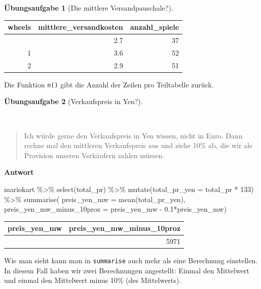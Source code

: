 \documentclass[
  letterpaper,
]{scrbook}
\newenvironment{Shaded}{\begin{snugshade}}{\end{snugshade}}
\newcommand{\AttributeTok}[1]{\textcolor[rgb]{0.40,0.45,0.13}{#1}}
\newcommand{\DecValTok}[1]{\textcolor[rgb]{0.68,0.00,0.00}{#1}}
\newcommand{\FloatTok}[1]{\textcolor[rgb]{0.68,0.00,0.00}{#1}}
\newcommand{\FunctionTok}[1]{\textcolor[rgb]{0.28,0.35,0.67}{#1}}
\newcommand{\NormalTok}[1]{\textcolor[rgb]{0.00,0.23,0.31}{#1}}
\newcommand{\SpecialCharTok}[1]{\textcolor[rgb]{0.37,0.37,0.37}{#1}}
\theoremstyle{definition}
\theoremstyle{definition}
\theoremstyle{definition}
\newtheorem{exercise}{Übungsaufgabe}[chapter]
\theoremstyle{remark}
\begin{document}
\begin{exercise}[Die mittlere
Versandpauschale?]
\begin{longtable}[]{@{}rrr@{}}
\toprule\noalign{}
wheels & mittlere\_versandkosten & anzahl\_spiele \\
\midrule\noalign{}
\endhead
\bottomrule\noalign{}
\endlastfoot
0 & 2.7 & 37 \\
1 & 3.6 & 52 \\
2 & 2.9 & 51 \\
\end{longtable}

Die Funktion \texttt{n()} gibt die Anzahl der Zeilen pro Teiltabelle
zurück.

\end{exercise}

\begin{exercise}[Verkaufspreis in
Yen?]\protect\hypertarget{exr-Forschungsfrage3}{}\label{exr-Forschungsfrage3}

~

\begin{quote}
{} Ich würde gerne den Verkaufspreis in Yen wissen, nicht
in Euro. Dann rechne mal den mittleren Verkaufspreis aus und ziehe 10\%
ab, die wir als Provision unseren Verkäufern zahlen müssen.
\end{quote}

\textbf{Antwort}

\begin{Shaded}
\begin{Highlighting}[]
\NormalTok{mariokart }\SpecialCharTok{\%\textgreater{}\%} 
  \FunctionTok{select}\NormalTok{(total\_pr) }\SpecialCharTok{\%\textgreater{}\%} 
  \FunctionTok{mutate}\NormalTok{(}\AttributeTok{total\_pr\_yen =}\NormalTok{ total\_pr }\SpecialCharTok{*} \DecValTok{133}\NormalTok{) }\SpecialCharTok{\%\textgreater{}\%} 
  \FunctionTok{summarise}\NormalTok{(}
    \AttributeTok{preis\_yen\_mw =} \FunctionTok{mean}\NormalTok{(total\_pr\_yen),}
    \AttributeTok{preis\_yen\_mw\_minus\_10proz =}\NormalTok{ preis\_yen\_mw }\SpecialCharTok{{-}} \FloatTok{0.1}\SpecialCharTok{*}\NormalTok{preis\_yen\_mw)}
\end{Highlighting}
\end{Shaded}

\begin{longtable}[]{@{}rr@{}}
\toprule\noalign{}
preis\_yen\_mw & preis\_yen\_mw\_minus\_10proz \\
\midrule\noalign{}
\endhead
\bottomrule\noalign{}
\endlastfoot
6634 & 5971 \\
\end{longtable}

Wie man sieht kann man in \texttt{summarise} auch mehr als eine
Berechnung einstellen. In diesem Fall haben wir zwei Berechnungen
angestellt: Einmal den Mittelwert und einmal den Mittelwert minus 10\%
(des Mittelwerts).

\end{exercise}
\end{document}
